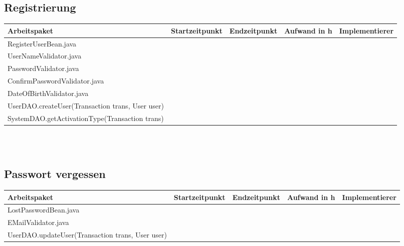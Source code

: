 \begin{landscape}
\subsection{Registrierung}
\begin{tabular}{|p{10cm}|p{4cm}|p{3cm}|p{3cm}|p{3cm}|}
	\hline  \textbf{Arbeitspaket} & \textbf{Startzeitpunkt} & \textbf{Endzeitpunkt} & \textbf{Aufwand in h} & \textbf{Implementierer} \\ 
	\hline   RegisterUserBean.java                                &                            &                             &                     &\\
	\hline   UserNameValidator.java                               &                            &                             &                     &\\ 
	\hline   PasswordValidator.java                               &                            &                             &                     &\\ 
	\hline   ConfirmPasswordValidator.java                        &                            &                             &                     &\\
	\hline   DateOfBirthValidator.java                            &                            &                             &                     &\\
	\hline   UserDAO.createUser(Transaction trans, User user)     &                            &                             &                     &\\ 
	\hline   SystemDAO.getActivationType(Transaction trans)       &                            &                             &                     &\\ 
	\hline 
\end{tabular} \ \\
\ \\

\subsection{Passwort vergessen}
\begin{tabular}{|p{10cm}|p{4cm}|p{3cm}|p{3cm}|p{3cm}|}
	\hline  \textbf{Arbeitspaket} & \textbf{Startzeitpunkt} & \textbf{Endzeitpunkt} & \textbf{Aufwand in h} & \textbf{Implementierer} \\ 
	\hline   LostPasswordBean.java                                &                            &                             &                     &\\
	\hline   EMailValidator.java                                  &                            &                             &                     &\\ 
	\hline   UserDAO.updateUser(Transaction trans, User user)     &                            &                             &                     &\\ 
	\hline 
\end{tabular} \ \\
\ \\


\end{landscape}
